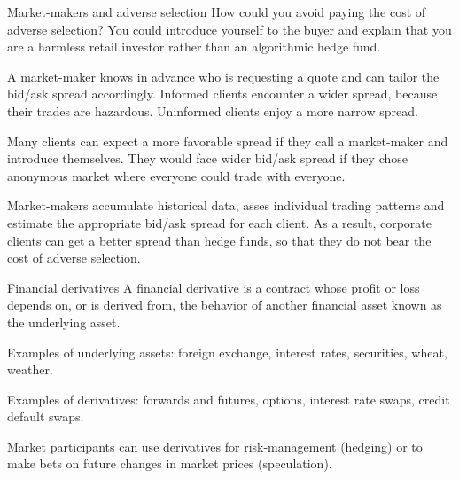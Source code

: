 \documentclass{beamer}
\begin{document}
\begin{frame}{Market-makers and adverse selection}
\justify
How could you avoid paying the cost of adverse selection? You could introduce yourself to the buyer and explain that you are a 
harmless retail investor rather than an algorithmic hedge fund.

\justify
A market-maker knows in advance \alert{who} is requesting a quote and can tailor the bid/ask spread accordingly. Informed clients encounter a wider spread, because their trades are hazardous. Uninformed clients enjoy a more narrow spread.

\justify
Many clients can expect a more favorable spread if they call a market-maker and introduce themselves. They would face wider bid/ask spread if they chose anonymous market where everyone could trade with everyone.

\justify
Market-makers accumulate historical data, asses individual trading patterns and estimate the appropriate bid/ask spread for each client. As a result, corporate clients can get a better spread than hedge funds, so that they do not bear the cost of adverse selection.
\end{frame}



\begin{frame}{Financial derivatives}
\justify
A \alert{financial derivative} is a contract whose profit or loss depends on, or is derived from, the behavior of another financial asset known as the \alert{underlying} asset.

\justify
Examples of underlying assets: foreign exchange, interest rates, securities, wheat, weather.

\justify
Examples of derivatives: forwards and futures, options, interest rate swaps, credit default swaps.

\justify
Market participants can use derivatives for risk-management (hedging) or to make bets on future changes in market prices (speculation). 
\end{frame}
\end{document}
